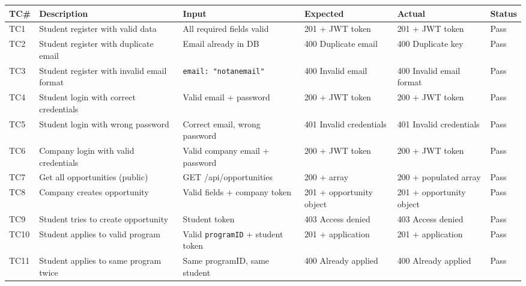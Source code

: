 \documentclass[12pt,a4paper]{article}
\begin{document}
\begin{longtable}{p{0.8cm}p{3.4cm}p{3cm}p{2.4cm}p{2.8cm}p{2cm}}
  \toprule
  \textbf{TC\#} & \textbf{Description} & \textbf{Input} & \textbf{Expected} & \textbf{Actual} & \textbf{Status} \\
  \midrule

  TC1 & Student register with valid data &
    All required fields valid &
    201 + JWT token &
    201 + JWT token &
    Pass \\[4pt]

  TC2 & Student register with duplicate email &
    Email already in DB &
    400 Duplicate email &
    400 Duplicate key &
    Pass \\[4pt]

  TC3 & Student register with invalid email format &
    \texttt{email: "notanemail"} &
    400 Invalid email &
    400 Invalid email format &
    Pass \\[4pt]

  TC4 & Student login with correct credentials &
    Valid email + password &
    200 + JWT token &
    200 + JWT token &
    Pass \\[4pt]

  TC5 & Student login with wrong password &
    Correct email, wrong password &
    401 Invalid credentials &
    401 Invalid credentials &
    Pass \\[4pt]

  TC6 & Company login with valid credentials &
    Valid company email + password &
    200 + JWT token &
    200 + JWT token &
    Pass \\[4pt]

  TC7 & Get all opportunities (public) &
    GET /api/opportunities &
    200 + array &
    200 + populated array &
    Pass \\[4pt]

  TC8 & Company creates opportunity &
    Valid fields + company token &
    201 + opportunity object &
    201 + opportunity object &
    Pass \\[4pt]

  TC9 & Student tries to create opportunity &
    Student token &
    403 Access denied &
    403 Access denied &
    Pass \\[4pt]

  TC10 & Student applies to valid program &
    Valid \texttt{programID} + student token &
    201 + application &
    201 + application &
    Pass \\[4pt]

  TC11 & Student applies to same program twice &
    Same programID, same student &
    400 Already applied &
    400 Already applied &
    Pass \\[4pt]


\end{longtable}
\end{document}
